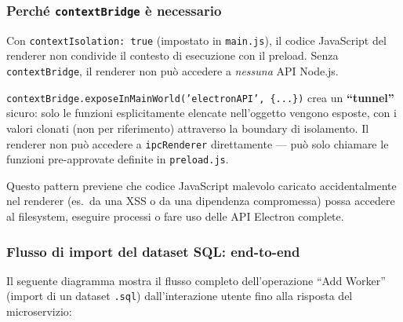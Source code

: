 \documentclass[a4paper,12pt]{article}
\begin{document}
\subsubsection{Perch\'{e} \texttt{contextBridge} \`{e} necessario}

\begin{infobox}
Con \texttt{contextIsolation: true} (impostato in \texttt{main.js}),
il codice JavaScript del renderer non condivide il contesto di esecuzione
con il preload. Senza \texttt{contextBridge}, il renderer non pu\`{o}
accedere a \textit{nessuna} API Node.js.

\texttt{contextBridge.exposeInMainWorld('electronAPI', \{...\})} crea un
\textbf{``tunnel''} sicuro: solo le funzioni esplicitamente elencate
nell'oggetto vengono esposte, con i valori clonati (non per riferimento)
attraverso la boundary di isolamento. Il renderer non pu\`{o} accedere
a \texttt{ipcRenderer} direttamente --- pu\`{o} solo chiamare le funzioni
pre-approvate definite in \texttt{preload.js}.

Questo pattern previene che codice JavaScript malevolo caricato
accidentalmente nel renderer (es.\ da una XSS o da una dipendenza
compromessa) possa accedere al filesystem, eseguire processi o fare
uso delle API Electron complete.
\end{infobox}

\subsubsection{Flusso di import del dataset SQL: end-to-end}

Il seguente diagramma mostra il flusso completo dell'operazione
``Add Worker'' (import di un dataset \texttt{.sql}) dall'interazione
utente fino alla risposta del microservizio:
\end{document}
